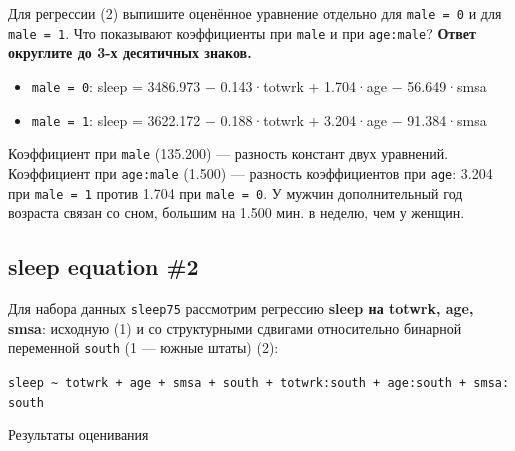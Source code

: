 \documentclass[
  russian,
]{article}
\providecommand{\tightlist}{%
  \setlength{\itemsep}{0pt}\setlength{\parskip}{0pt}}
\begin{document}
Для регрессии (2) выпишите оценённое уравнение отдельно для
\texttt{male\ =\ 0} и для \texttt{male\ =\ 1}. Что показывают
коэффициенты при \texttt{male} и при \texttt{age:male}? \textbf{Ответ
округлите до 3-х десятичных знаков.}

\begin{tcolorbox}[enhanced jigsaw, arc=.35mm, bottomrule=.15mm, bottomtitle=1mm, breakable, colback=white, colbacktitle=quarto-callout-tip-color!10!white, colframe=quarto-callout-tip-color-frame, coltitle=black, left=2mm, leftrule=.75mm, opacityback=0, opacitybacktitle=0.6, rightrule=.15mm, title=\textcolor{quarto-callout-tip-color}{\faLightbulb}\hspace{0.5em}{Ответ}, titlerule=0mm, toprule=.15mm, toptitle=1mm]

\begin{itemize}
\tightlist
\item
  \texttt{male\ =\ 0}: sleep = 3486.973 − 0.143·totwrk + 1.704·age −
  56.649·smsa
\item
  \texttt{male\ =\ 1}: sleep = 3622.172 − 0.188·totwrk + 3.204·age −
  91.384·smsa
\end{itemize}

Коэффициент при \texttt{male} (135.200) --- разность констант двух
уравнений. Коэффициент при \texttt{age:male} (1.500) --- разность
коэффициентов при \texttt{age}: 3.204 при \texttt{male\ =\ 1} против
1.704 при \texttt{male\ =\ 0}. У мужчин дополнительный год возраста
связан со сном, большим на 1.500 мин. в неделю, чем у женщин.

\end{tcolorbox}

\subsection{sleep equation \#2}\label{sleep-equation-2}

Для набора данных \texttt{sleep75} рассмотрим регрессию \textbf{sleep на
totwrk, age, smsa}: исходную (1) и со структурными сдвигами относительно
бинарной переменной \texttt{south} (1 --- южные штаты) (2):

\texttt{sleep\ \textasciitilde{}\ totwrk\ +\ age\ +\ smsa\ +\ south\ +\ totwrk:south\ +\ age:south\ +\ smsa:south}

Результаты оценивания
\end{document}
